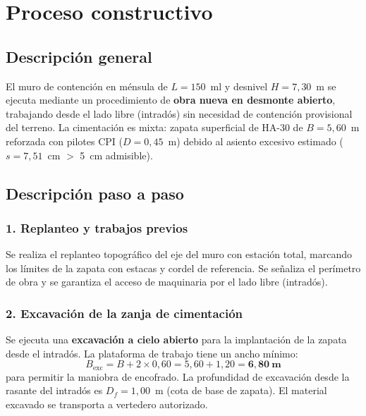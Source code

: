 \section{Proceso constructivo}
\label{sec:muro_proceso}

\subsection{Descripción general}

El muro de contención en ménsula de $L = 150$~ml y desnivel $H = 7{,}30$~m se
ejecuta mediante un procedimiento de \textbf{obra nueva en desmonte abierto},
trabajando desde el lado libre (intradós) sin necesidad de contención provisional
del terreno. La cimentación es mixta: zapata superficial de HA-30 de
$B = 5{,}60$~m reforzada con pilotes CPI ($D = 0{,}45$~m) debido al asiento
excesivo estimado ($s = 7{,}51$~cm $>$ 5~cm admisible).

\subsection{Descripción paso a paso}
\label{subsec:proceso_pasos}

\subsubsection*{1. Replanteo y trabajos previos}

Se realiza el replanteo topográfico del eje del muro con estación total, marcando
los límites de la zapata con estacas y cordel de referencia. Se señaliza el
perímetro de obra y se garantiza el acceso de maquinaria por el lado libre
(intradós).

\subsubsection*{2. Excavación de la zanja de cimentación}

Se ejecuta una \textbf{excavación a cielo abierto} para la implantación de la
zapata desde el intradós. La plataforma de trabajo tiene un ancho mínimo:
\[
  B_{\mathrm{exc}} = B + 2 \times 0{,}60 = 5{,}60 + 1{,}20
  = \mathbf{6{,}80~\text{m}}
\]
para permitir la maniobra de encofrado. La profundidad de excavación desde la
rasante del intradós es $D_f = 1{,}00$~m (cota de base de zapata).
El material excavado se transporta a vertedero autorizado.

